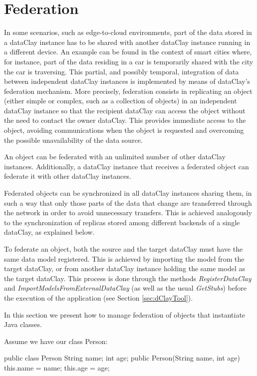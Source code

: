 \section{Federation}
\label{sec:jFederation}

In some scenarios, such as edge-to-cloud environments, part of the data stored in a dataClay instance has to be shared with another dataClay instance running in a different device. An example can be found in the context of smart cities where, for instance, part of the data residing in a car is temporarily shared with the city the car is traversing. This partial, and possibly temporal, integration of data between independent dataClay instances is implemented by means of dataClay's federation mechanism.
More precisely, federation consists in replicating an object (either simple or complex, such as a collection of objects) in an independent dataClay instance so that the recipient dataClay can access the object without the need to contact the owner dataClay. This provides immediate access to the object, avoiding communications when the object is requested and overcoming the possible unavailability of the data source. 

An object can be federated with an unlimited number of other dataClay instances. Additionally, a dataClay instance that receives a federated object can federate it with other dataClay instances.

Federated objects can be synchronized in all dataClay instances sharing them, in such a way that only those parts of the data that change are transferred through the network in order to avoid unnecessary transfers. This is achieved analogously to the synchronization of replicas stored among different backends of a single dataClay, as explained below. 

To federate an object, both the source and the target dataClay must have the same data model registered. This is achieved by importing the model from the target dataClay, or from another dataClay instance holding the same model as the target dataClay. This process is done through the methods \textit{RegisterDataClay} and \textit{ImportModelsFromExternalDataClay} (as well as the usual \textit{GetStubs}) before the execution of the application (see Section \ref{sec:dClayTool}).

In this section we present how to manage federation of objects that instantiate Java classes. 

Assume we have our class Person:

\begin{tBox}
\begin{java}
public class Person {
  String name;
  int age;
  public Person(String name, int age) {
    this.name = name;
    this.age = age;
  }
}
\end{java}
\end{tBox}

